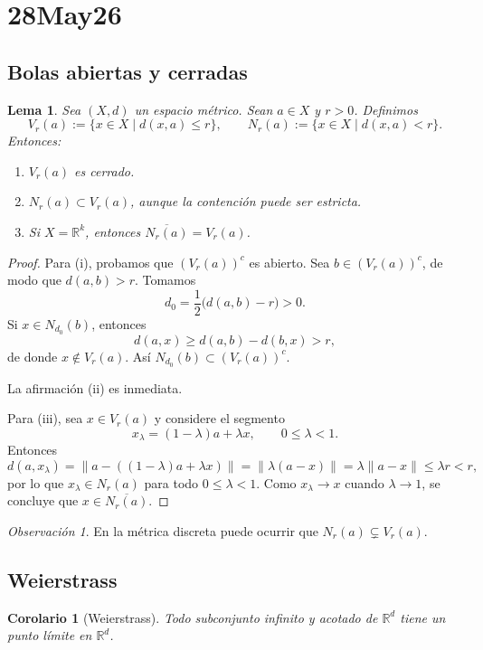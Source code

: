 \documentclass[12pt]{article}
\theoremstyle{definition}
\theoremstyle{plain}
\newtheorem{lemma}[definition]{Lema}
\newtheorem{corollary}[definition]{Corolario}
\theoremstyle{remark}
\newtheorem*{remark}{Observación}
\begin{document}
\section*{28May26}

\subsection*{Bolas abiertas y cerradas}

\begin{lemma}
Sea $(X,d)$ un espacio métrico. Sean $a\in X$ y $r>0$.
Definimos
\[
V_r(a):=\{x\in X\mid d(x,a)\le r\},
\qquad
N_r(a):=\{x\in X\mid d(x,a)<r\}.
\]
Entonces:
\begin{enumerate}[label=\roman*)]
    \item $V_r(a)$ es cerrado.
    \item $N_r(a)\subset V_r(a)$, aunque la contención puede ser estricta.
    \item Si $X=\mathbb R^k$, entonces $\overline{N_r(a)}=V_r(a)$.
\end{enumerate}
\end{lemma}

\begin{proof}
Para (i), probamos que $(V_r(a))^c$ es abierto.
Sea $b\in (V_r(a))^c$, de modo que $d(a,b)>r$.
Tomamos
\[
d_0=\frac12\bigl(d(a,b)-r\bigr)>0.
\]
Si $x\in N_{d_0}(b)$, entonces
\[
d(a,x)\ge d(a,b)-d(b,x)>r,
\]
de donde $x\notin V_r(a)$.
Así $N_{d_0}(b)\subset (V_r(a))^c$.

La afirmación (ii) es inmediata.

Para (iii), sea $x\in V_r(a)$ y considere el segmento
\[
x_\lambda=(1-\lambda)a+\lambda x,\qquad 0\le\lambda<1.
\]
Entonces
\[
d(a,x_\lambda)=\|a-((1-\lambda)a+\lambda x)\|
=\|\lambda(a-x)\|
=\lambda\|a-x\|
\le \lambda r<r,
\]
por lo que $x_\lambda\in N_r(a)$ para todo $0\le\lambda<1$.
Como $x_\lambda\to x$ cuando $\lambda\to 1$, se concluye que $x\in\overline{N_r(a)}$.
\end{proof}

\begin{remark}
En la métrica discreta puede ocurrir que $N_r(a)\subsetneq V_r(a)$.
\end{remark}

\subsection*{Weierstrass}

\begin{corollary}[Weierstrass]
Todo subconjunto infinito y acotado de $\mathbb R^d$ tiene un punto límite en $\mathbb R^d$.
\end{corollary}
\end{document}

